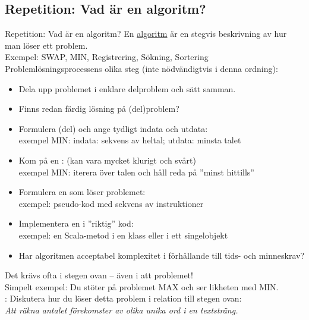 

\ifkompendium\else
\subsection{Repetition: Vad är en algoritm?}
\begin{Slide}{Repetition: Vad är en algoritm? }\SlideFontTiny
\pause En \href{https://sv.wikipedia.org/wiki/Algoritm}{algoritm} är en stegvis beskrivning av hur man löser ett problem. \\ 
Exempel: SWAP, MIN, Registrering, Sökning, Sortering \\
\pause\vspace{0.5em}
Problemlösningsprocessens olika steg (inte nödvändigtvis i denna ordning): 
\begin{itemize}
\item Dela upp problemet i enklare delproblem och sätt samman.
\item Finns redan färdig lösning på (del)problem?
\item Formulera (del) och ange tydligt indata och utdata: \\ exempel MIN: indata: sekvens av heltal; utdata: minsta talet
\item Kom på en : (kan  vara mycket klurigt och svårt) \\ exempel MIN: iterera över talen och håll reda på ''minst hittills''
\item Formulera en  som löser problemet: \\ exempel: pseudo-kod med sekvens av instruktioner
\item Implementera en  i ''riktig'' kod: \\ exempel: en Scala-metod i en klass eller i ett singelobjekt
\item Har algoritmen acceptabel komplexitet i förhållande till tids- och minneskrav?
\end{itemize}
\pause Det krävs ofta  i stegen ovan  -- även i att  problemet!\\
Simpelt exempel: Du stöter på problemet MAX och ser likheten med MIN.\\
\pause\vspace{0.5em}: Diskutera hur du löser detta problem i relation till stegen ovan: \\
\emph{Att räkna antalet förekomster av olika unika ord i en textsträng.} 
\end{Slide}


\fi











